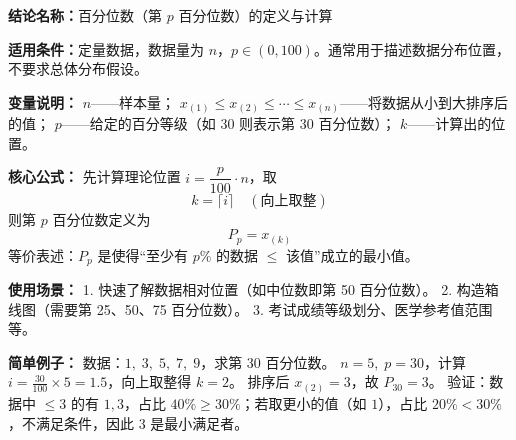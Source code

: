 \textbf{结论名称：}百分位数（第 $p$ 百分位数）的定义与计算

\textbf{适用条件：}定量数据，数据量为 $n$，$p\in(0,100)$。通常用于描述数据分布位置，不要求总体分布假设。

\textbf{变量说明：}
$n$——样本量；
$x_{(1)}\le x_{(2)}\le\cdots\le x_{(n)}$——将数据从小到大排序后的值；
$p$——给定的百分等级（如 $30$ 则表示第 30 百分位数）；
$k$——计算出的位置。

\textbf{核心公式：}
先计算理论位置 $i = \dfrac{p}{100}\cdot n$，取
\[
k = \lceil i \rceil \quad (\text{向上取整})
\]
则第 $p$ 百分位数定义为
\[
\boxed{P_p = x_{(k)}}
\]
等价表述：$P_p$ 是使得“至少有 $p\%$ 的数据 $\le$ 该值”成立的最小值。

\textbf{使用场景：}
1. 快速了解数据相对位置（如中位数即第 50 百分位数）。
2. 构造箱线图（需要第 25、50、75 百分位数）。
3. 考试成绩等级划分、医学参考值范围等。

\textbf{简单例子：}
数据：$1,\;3,\;5,\;7,\;9$，求第 $30$ 百分位数。
$n=5,\;p=30$，计算 $i=\frac{30}{100}\times 5=1.5$，向上取整得 $k=2$。
排序后 $x_{(2)}=3$，故 $P_{30}=3$。
验证：数据中 $\le 3$ 的有 $1,3$，占比 $40\%\ge 30\%$；若取更小的值（如 $1$），占比 $20\%<30\%$，不满足条件，因此 $3$ 是最小满足者。
